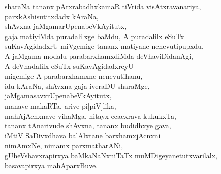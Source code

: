\begin{entry}
\medskip

\begin{shl}
sharaNa tananx pArxrabadhxkamaR tiVrida visAtxravanariya,\\
parxkAshisutitxdadx kAraNa,\\
shAvxna jaMgamarUpenabeVkAyitutx,\\
gaja matiyiMda puradalilxge baMdu, A puradalilx eSuTx\\
suKavAgidadxrU miVgemige tananx matiyane nenevutipupxdu,\\
A jaMgama modalu parabarxhamxdiMda deVhaviDidanAgi,\\
A deVhadalilx eSuTx suKavAgidadxreyU\\
migemige A parabarxhamxne nenevutihanu,\\
idu kAraNa, shAvxna gaja iveraDU sharaMge,\\
jaMgamasavxrUpenabeVkAyitutx,\\
manave makaRTa, arive pi[piV]lika,\\
mahAjAcnxnave vihaMga, nitayx ecacxrava kukukxTa,\\
tananx tAnarivude shAvxna, tananx budidhxye gava,\\
iMtiV SaDivxdhava balAlxtane barxhamxjAcnxni\\
nimAmxNe, nimamx parxmatharANi,\\
gUheVshavxrapirxya baMkaNaNxniTaTx muMDigeyanetutxvarilalx,\\
basavapirxya mahAparxBuve.
\end{shl}
\smallskip
{}
\end{entry}

